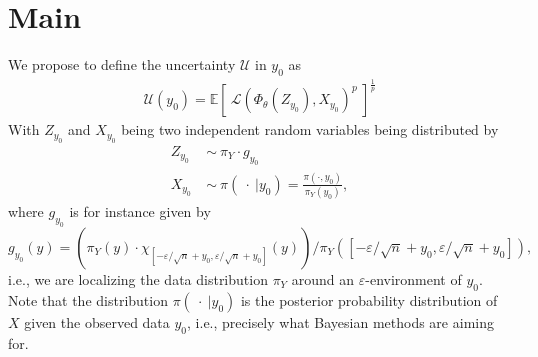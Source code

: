\documentclass{article}
\begin{document}
\section*{Main}
We propose to define the uncertainty $\mathcal{U}$ in $y_0$ as
\begin{align}
\mathcal{U}(y_0) = \mathbb{E}\left[\ \mathcal{L}(\Phi_\theta (Z_{y_0}),X_{y_0})^p \  \right]^{\frac{1}{p}}
\label{eq:main}
\end{align}
With $Z_{y_0}$ and $X_{y_0}$ being two independent random variables being distributed by
\begin{align*}
Z_{y_0}\ &\sim\ \pi_Y \cdot g_{y_0} \\
X_{y_0}\ &\sim\ \pi\left(\ \cdot\ | y_0\right) = \frac{\pi(\cdot,y_0)}{\pi_Y(y_0)},
\end{align*}
where $g_{y_0}$ is for instance given by
\[
 g_{y_0}( y) = \left(\pi_Y(y) \cdot  \chi_{[-\varepsilon / \sqrt{n} + y_0,\varepsilon / \sqrt{n} + y_0]} (y) \right)  / \pi_Y ([-\varepsilon / \sqrt{n} + y_0,\varepsilon / \sqrt{n} + y_0]),
 \]
 i.e., we are localizing the data distribution $\pi_Y$ around an $\varepsilon$-environment of $y_0$. 
 Note that the distribution $\pi\left(\ \cdot\ | y_0\right)$ is the posterior probability distribution of $X$ given the observed data $y_0$, i.e., precisely what Bayesian methods are aiming for.\\
 
\end{document}
